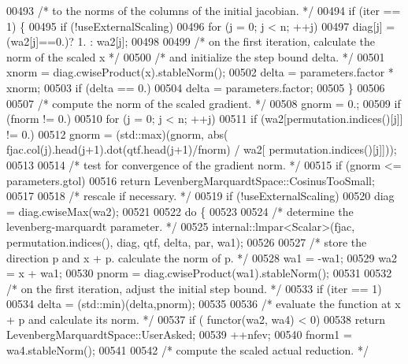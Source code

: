 \begin{DoxyCode}
00493     \textcolor{comment}{/* to the norms of the columns of the initial jacobian. */}
00494     \textcolor{keywordflow}{if} (iter == 1) \{
00495         \textcolor{keywordflow}{if} (!useExternalScaling)
00496             \textcolor{keywordflow}{for} (j = 0; j < n; ++j)
00497                 diag[j] = (wa2[j]==0.)? 1. : wa2[j];
00498 
00499         \textcolor{comment}{/* on the first iteration, calculate the norm of the scaled x */}
00500         \textcolor{comment}{/* and initialize the step bound delta. */}
00501         xnorm = diag.cwiseProduct(x).stableNorm();
00502         delta = parameters.factor * xnorm;
00503         \textcolor{keywordflow}{if} (delta == 0.)
00504             delta = parameters.factor;
00505     \}
00506 
00507     \textcolor{comment}{/* compute the norm of the scaled gradient. */}
00508     gnorm = 0.;
00509     \textcolor{keywordflow}{if} (fnorm != 0.)
00510         \textcolor{keywordflow}{for} (j = 0; j < n; ++j)
00511             \textcolor{keywordflow}{if} (wa2[permutation.indices()[j]] != 0.)
00512                 gnorm = (std::max)(gnorm, abs( fjac.col(j).head(j+1).dot(qtf.head(j+1)/fnorm) / wa2[
      permutation.indices()[j]]));
00513 
00514     \textcolor{comment}{/* test for convergence of the gradient norm. */}
00515     \textcolor{keywordflow}{if} (gnorm <= parameters.gtol)
00516         \textcolor{keywordflow}{return} LevenbergMarquardtSpace::CosinusTooSmall;
00517 
00518     \textcolor{comment}{/* rescale if necessary. */}
00519     \textcolor{keywordflow}{if} (!useExternalScaling)
00520         diag = diag.cwiseMax(wa2);
00521 
00522     \textcolor{keywordflow}{do} \{
00523 
00524         \textcolor{comment}{/* determine the levenberg-marquardt parameter. */}
00525         internal::lmpar<Scalar>(fjac, permutation.indices(), diag, qtf, delta, par, wa1);
00526 
00527         \textcolor{comment}{/* store the direction p and x + p. calculate the norm of p. */}
00528         wa1 = -wa1;
00529         wa2 = x + wa1;
00530         pnorm = diag.cwiseProduct(wa1).stableNorm();
00531 
00532         \textcolor{comment}{/* on the first iteration, adjust the initial step bound. */}
00533         \textcolor{keywordflow}{if} (iter == 1)
00534             delta = (std::min)(delta,pnorm);
00535 
00536         \textcolor{comment}{/* evaluate the function at x + p and calculate its norm. */}
00537         \textcolor{keywordflow}{if} ( functor(wa2, wa4) < 0)
00538             \textcolor{keywordflow}{return} LevenbergMarquardtSpace::UserAsked;
00539         ++nfev;
00540         fnorm1 = wa4.stableNorm();
00541 
00542         \textcolor{comment}{/* compute the scaled actual reduction. */}

\end{DoxyCode}
